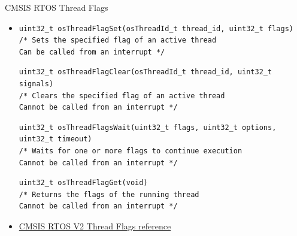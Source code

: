 \begin{frame}[fragile]{CMSIS RTOS Thread Flags}

    \begin{itemize}
        \item []
         \begin{verbatim}
uint32_t osThreadFlagSet(osThreadId_t thread_id, uint32_t flags)
/* Sets the specified flag of an active thread
Can be called from an interrupt */

         \end{verbatim}
         \begin{verbatim}
uint32_t osThreadFlagClear(osThreadId_t thread_id, uint32_t signals)
/* Clears the specified flag of an active thread
Cannot be called from an interrupt */

         \end{verbatim}
         \begin{verbatim}
uint32_t osThreadFlagsWait(uint32_t flags, uint32_t options, uint32_t timeout)
/* Waits for one or more flags to continue execution
Cannot be called from an interrupt */

         \end{verbatim}
         \begin{verbatim}
uint32_t osThreadFlagGet(void)
/* Returns the flags of the running thread
Cannot be called from an interrupt */

         \end{verbatim}
         \item[] \href{https://arm-software.github.io/CMSIS_5/RTOS2/html/group__CMSIS__RTOS__ThreadFlagsMgmt.html}{CMSIS RTOS V2 Thread Flags reference}
    \end{itemize}
\end{frame}

